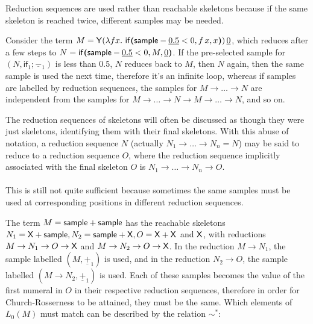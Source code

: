 Reduction sequences are used rather than reachable skeletons because if the same skeleton is reached twice, different samples may be needed. 

\begin{example} Consider the term $M = \tY (\lambda f x.\ \tif{\tsample - \underline{0.5} < 0}{f \, x}{x}) \, \underline 0$, which reduces after a few steps to $N = \mathsf{if}\boldsymbol{(}\mathsf{sample} - \underline{0.5}  < 0, M, \underline 0\boldsymbol{)}$. If the pre-selected sample for $(N,\textsf{if}_1;\underline{-}_1)$ is less than 0.5, $N$ reduces back to $M$, then $N$ again, then the same sample is used the next time, therefore it's an infinite loop, whereas if samples are labelled by reduction sequences, the samples for $M \to \dots \to N$ are independent from the samples for $M \to \dots \to N \to M \to \dots \to N$, and so on.
\end{example}

The reduction sequences of skeletons will often be discussed as though they were just skeletons, identifying them with their final skeletons. With this abuse of notation, a reduction sequence $N$ (actually $N_1 \to \dots \to N_n = N$) may be said to reduce to a reduction sequence $O$, where the reduction sequence implicitly associated with the final skeleton $O$ is $N_1 \to \dots \to N_n \to O$.

\paragraph{}
This is still not quite sufficient because sometimes the same samples must be used at corresponding positions in different reduction sequences. 

\begin{example} \label{ex:cousin sim} 
The term $M = \mathsf{sample} + \mathsf{sample}$ has the reachable skeletons $N_1 = \mathsf{X} + \mathsf{sample}, N_2 = \mathsf{sample} + \mathsf{X}, O = \mathsf{X} + \mathsf{X}$ and $\mathsf{X}$, with reductions $M \to N_1 \to O \to \mathsf{X}$ and $M \to N_2 \to O \to \mathsf{X}$. 
In the reduction $M \to N_1$, the sample labelled $(M, \underline{+}_1)$ is used, and in the reduction $N_2 \to O$, the sample labelled $(M \to N_2, \underline{+}_1)$ is used. 
Each of these samples becomes the value of the first numeral in $O$ in their respective reduction sequences, therefore in order for Church-Rosserness to be attained, they must be the same. Which elements of $L_0(M)$ must match can be described by the relation $\sim^*$:
\end{example}

